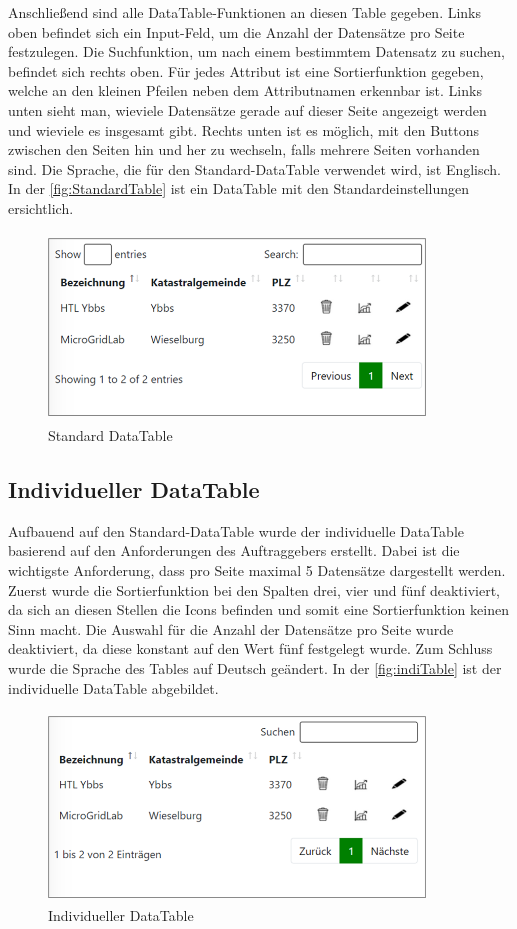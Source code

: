 Anschließend sind alle DataTable-Funktionen an diesen Table gegeben.
Links oben befindet sich ein Input-Feld, um die Anzahl der Datensätze pro Seite festzulegen. Die Suchfunktion, um nach einem bestimmtem Datensatz zu suchen, befindet sich rechts oben.
Für jedes Attribut ist eine Sortierfunktion gegeben, welche an den kleinen Pfeilen neben dem Attributnamen erkennbar ist. Links unten sieht man, wieviele Datensätze gerade auf dieser Seite angezeigt werden und wieviele es insgesamt gibt. Rechts unten ist es möglich, mit den Buttons zwischen den Seiten hin und her zu wechseln, falls mehrere Seiten vorhanden sind.
Die Sprache, die für den Standard-DataTable verwendet wird, ist Englisch.
In der \autoref{fig:StandardTable} ist ein DataTable mit den Standardeinstellungen ersichtlich.
\newline
\begin{figure}[h]
	\centering
	\includegraphics[height=5cm,width=10cm]{images/DataTableStandard}
	\caption{Standard DataTable}
	\label{fig:StandardTable}
\end{figure}


\subsection{Individueller DataTable}
Aufbauend auf den Standard-DataTable wurde der individuelle DataTable basierend auf den Anforderungen des Auftraggebers erstellt. Dabei ist die wichtigste Anforderung, dass pro Seite maximal 5 Datensätze dargestellt werden.
Zuerst wurde die Sortierfunktion bei den Spalten drei, vier und fünf deaktiviert, da sich an diesen Stellen die Icons befinden und somit eine Sortierfunktion keinen Sinn macht. Die Auswahl für die Anzahl der Datensätze pro Seite wurde deaktiviert, da diese konstant auf den Wert fünf festgelegt wurde. Zum Schluss wurde die Sprache des Tables auf Deutsch geändert.
In der \autoref{fig:indiTable} ist der individuelle DataTable abgebildet.
\begin{figure}[h]
	\centering
	\includegraphics[height=5cm,width=10cm]{images/DataTableIndividuell}
	\caption{Individueller DataTable}
	\label{fig:indiTable}
\end{figure}





